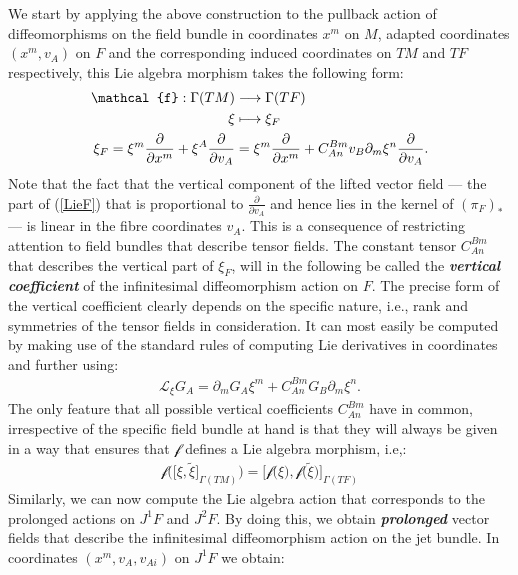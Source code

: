 We start by applying the above construction to the pullback action of diffeomorphisms on the field bundle in coordinates $x^m$ on $M$, adapted coordinates $(x^m, v_A)$ on $F$ and the corresponding induced coordinates on $TM$ and $TF$ respectively, this Lie algebra morphism takes the following form:
\begin{align}\label{LieF}
\begin{aligned}
    \mathcal{f} : \Gamma(TM) &\longrightarrow \Gamma(TF)\\
    \xi &\longmapsto \xi_F \\
    \smallskip
    \xi_F = \xi^m \frac{\partial}{\partial x^m} + \xi^A \frac{\partial}{\partial v_A} &= \xi^m \frac{\partial}{\partial x^m} + C_{An}^{Bm} v_B \partial_m \xi ^n \frac{\partial}{\partial v_A}. 
\end{aligned}
\end{align}
Note that the fact that the vertical component of the lifted vector field --- the part of (\ref{LieF}) that is proportional to $\frac{\partial}{\partial v_A}$ and hence lies in the kernel of $(\pi_F)_{\ast}$ --- is linear in the fibre coordinates $v_A$. This is a consequence of restricting attention to field bundles that describe tensor fields.
The constant tensor $C_{An}^{Bm}$ that describes the vertical part of $\xi_F$, will in the following be called the \textit{\textbf{vertical coefficient}} of the infinitesimal  diffeomorphism action on $F$. The precise form of the vertical coefficient clearly depends on the specific nature, i.e., rank and symmetries of the tensor fields in consideration.
It can most easily be computed by making use of the standard rules of computing Lie derivatives in coordinates and further using:
\begin{align}
    \mathcal{L}_{\xi} G_A = \partial_m G_A \xi^m + C_{An}^{Bm} G_B \partial_m \xi ^n.
\end{align}
The only feature that all possible vertical coefficients $C_{An}^{Bm}$ have in common, irrespective of the specific field bundle at hand is that they will always be given in a way that ensures that $\mathcal{f}$ defines a Lie algebra morphism, i.e,: 
\begin{align}
\mathcal{f}\bigl ( \bigl [\xi, \tilde{\xi} \bigr ]_{\Gamma(TM)}\bigr ) = \bigl [ \mathcal{f}\bigl (\xi\bigr ), \mathcal{f}\bigl (\tilde{\xi}\bigr ) \bigr]_{\Gamma(TF)}
\end{align}
Similarly, we can now compute the Lie algebra action that corresponds to the prolonged actions on $J^1F$ and $J^2F$. By doing this, we obtain \textbf{\textit{prolonged}} vector fields that describe the infinitesimal diffeomorphism action on the jet bundle. In coordinates $(x^m,v_A,v_{Ai})$ on $J^1F$ we obtain:
